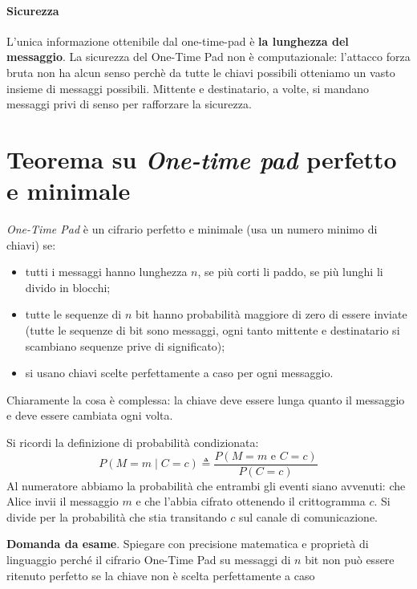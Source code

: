 \paragraph{Sicurezza} L'unica informazione ottenibile dal one-time-pad è \textbf{la lunghezza del messaggio}. La sicurezza del One-Time Pad non è computazionale: l'attacco forza bruta non ha alcun senso perchè da tutte le chiavi possibili otteniamo un vasto insieme di messaggi possibili. Mittente e destinatario, a volte, si mandano messaggi privi di senso per rafforzare la sicurezza.





\section{Teorema su \emph{One-time pad} perfetto e minimale}
\emph{One-Time Pad} è un cifrario perfetto e minimale (usa un numero minimo di chiavi) se:
\begin{itemize}
    \item tutti i messaggi hanno lunghezza $n$, se più corti li paddo, se più lunghi li divido in blocchi;
    \item tutte le sequenze di $n$ bit hanno probabilità maggiore di zero di essere inviate (tutte le sequenze di bit sono messaggi, ogni tanto mittente e destinatario si scambiano sequenze prive di significato);
    \item si usano chiavi scelte perfettamente a caso per ogni messaggio.
\end{itemize}
Chiaramente la cosa è complessa: la chiave deve essere lunga quanto il messaggio e deve essere cambiata ogni volta.
\begin{framed}
\noindent Si ricordi la definizione di probabilità condizionata:
$$ P(M=m \mid C=c) \triangleq \frac{P(M=m\text{ e }C=c)}{P(C=c)} $$
Al numeratore abbiamo la probabilità che entrambi gli eventi siano avvenuti: che Alice invii il messaggio $m$ e che l'abbia cifrato ottenendo il crittogramma $c$. Si divide per la probabilità che stia transitando $c$ sul canale di comunicazione.
\end{framed} 
\begin{framed}
	\noindent \textbf{Domanda da esame}. Spiegare con precisione matematica e proprietà di linguaggio perché il cifrario One-Time Pad su messaggi di $n$ bit non può essere ritenuto perfetto se la chiave non è scelta perfettamente a caso
\end{framed}
